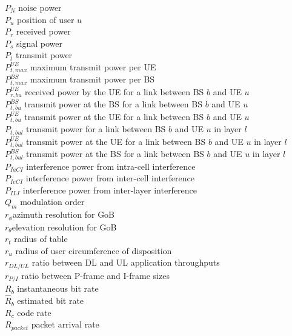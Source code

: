 $P_N$ \mytab noise power \\
$P_u$ \mytab position of user $u$ \\
$P_r$ \mytab received power \\
$P_s$ \mytab signal power \\
$P_t$ \mytab transmit power \\
$P_{t, max}^{UE}$ \mytab maximum transmit power per UE\\
$P_{t, max}^{BS}$ \mytab maximum transmit power per BS \\
$P_{r, bu}^{UE}$ \mytab received power by the UE for a link between BS $b$ and UE $u$ \\
$P_{t, bu}^{BS}$ \mytab transmit power at the BS for a link between BS $b$ and UE $u$ \\
$P_{t, bu}^{UE}$ \mytab transmit power at the UE for a link between BS $b$ and UE $u$ \\
$P_{t, bul}$ \mytab transmit power for a link between BS $b$ and UE $u$ in layer $l$ \\
$P_{t, bul}^{UE}$ \mytab transmit power at the UE for a link between BS $b$ and UE $u$ in layer $l$ \\
$P_{t, bul}^{BS}$ \mytab transmit power at the BS for a link between BS $b$ and UE $u$ in layer $l$ \\
$P_{IaCI}$ \mytab interference power from intra-cell interference \\
$P_{IeCI}$ \mytab interference power from inter-cell interference \\
$P_{ILI}$ \mytab interference power from inter-layer interference \\
$Q_m$ \mytab modulation order \\
$r_\phi$\mytab azimuth resolution for \acs{GoB} \\
$r_\theta$\mytab elevation resolution for \acs{GoB} \\
$r_t$ \mytab radius of table \\
$r_u$ \mytab radius of user circumference of disposition\\
$r_{DL/UL}$ \mytab ratio between \acs{DL} and \acs{UL} application throughputs\\
$r_{P/I}$ \mytab ratio between P-frame and I-frame sizes\\
$R_b$ \mytab instantaneous bit rate \\
$\hat{R}_b$ \mytab estimated bit rate \\
$R_c$ \mytab code rate \\
$R_{packet}$ \mytab packet arrival rate \\
